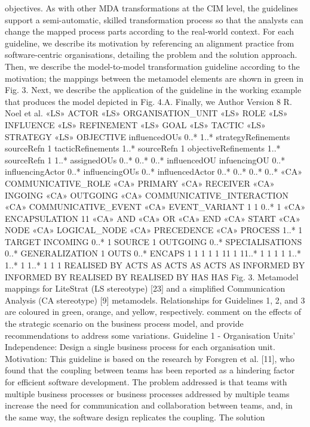 objectives. As with other MDA transformations at the CIM level, the guidelines
support a semi-automatic, skilled transformation process so that the analysts
can change the mapped process parts according to the real-world context.
For each guideline, we describe its motivation by referencing an alignment
practice from software-centric organisations, detailing the problem and the solution approach. Then, we describe the model-to-model transformation guideline
according to the motivation; the mappings between the metamodel elements are
shown in green in Fig. 3. Next, we describe the application of the guideline in
the working example that produces the model depicted in Fig. 4.A. Finally, we
Author Version
8 R. Noel et al.
«LS»
ACTOR
«LS»
ORGANISATION_UNIT
«LS»
ROLE
«LS»
INFLUENCE
«LS»
REFINEMENT
«LS»
GOAL
«LS»
TACTIC
«LS»
STRATEGY
«LS»
OBJECTIVE
influencedOUs
0..*
1..* strategyRefinements
sourceRefn 1
tacticRefinements 1..*
sourceRefn 1
objectiveRefinements 1..*
sourceRefn 1
1..*
assignedOUs
0..*
0..*
0..*
influencedOU
infuencingOU
0..*
influencingActor
0..*
influencingOUs
0..* influencedActor
0..*
0..*
0..*
0..*
«CA»
COMMUNICATIVE_ROLE
«CA»
PRIMARY
«CA»
RECEIVER
«CA»
INGOING
«CA»
OUTGOING
«CA»
COMMUNICATIVE_INTERACTION
«CA»
COMMUNICATIVE_EVENT
«CA»
EVENT_VARIANT
1 1
0..* 1
«CA»
ENCAPSULATION
11
«CA»
AND
«CA»
OR
«CA»
END
«CA»
START
«CA»
NODE
«CA»
LOGICAL_NODE
«CA»
PRECEDENCE
«CA»
PROCESS 1..* 1
TARGET
INCOMING
0..*
1
SOURCE
1
OUTGOING
0..*
SPECIALISATIONS
0..*
GENERALIZATION
1
OUTS
0..* ENCAPS
1
1
1 1
1
11
1
11..*
1
1 1 1
1..*
1..*
1 1..*
1
1 1
REALISED BY
ACTS AS
ACTS AS
ACTS AS
INFORMED BY
INFORMED BY
REALISED BY
REALISED BY
HAS HAS
Fig. 3. Metamodel mappings for LiteStrat (LS stereotype) [23] and a simplified Communication Analysis (CA stereotype) [9] metamodels. Relationships for Guidelines 1,
2, and 3 are coloured in green, orange, and yellow, respectively.
comment on the effects of the strategic scenario on the business process model,
and provide recommendations to address some variations.
Guideline 1 - Organisation Units’ Independence: Design a single business process for each organisation unit.
Motivation: This guideline is based on the research by Forsgren et al. [11],
who found that the coupling between teams has been reported as a hindering
factor for efficient software development. The problem addressed is that teams
with multiple business processes or business processes addressed by multiple
teams increase the need for communication and collaboration between teams,
and, in the same way, the software design replicates the coupling. The solution
